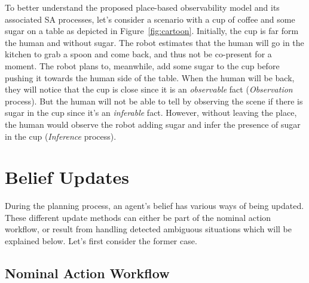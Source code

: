 \documentclass[letterpaper]{article} %
\begin{document}

To better understand the proposed place-based observability model and its associated SA processes, let's consider a scenario with a cup of coffee and some sugar on a table as depicted in Figure~\ref{fig:cartoon}.
Initially, the cup is far form the human and without sugar. 
The robot estimates that the human will go in the kitchen to grab a spoon and come back, and thus not be co-present for a moment. 
The robot plans to, meanwhile, add some sugar to the cup before pushing it towards the human side of the table.
When the human will be back, they will notice that the cup is close since it is an \textit{observable} fact (\textit{Observation} process). 
But the human will not be able to tell by observing the scene if there is sugar in the cup since it's an \textit{inferable} fact. However, without leaving the place, the human would observe the robot adding sugar and infer the presence of sugar in the cup (\textit{Inference} process). 


\section{Belief Updates}

During the planning process, an agent's belief has various ways of being updated. These different update methods can either be part of the nominal action workflow, or result from handling detected ambiguous situations which will be explained below. Let's first consider the former case.

\subsection{Nominal Action Workflow}
\end{document}
